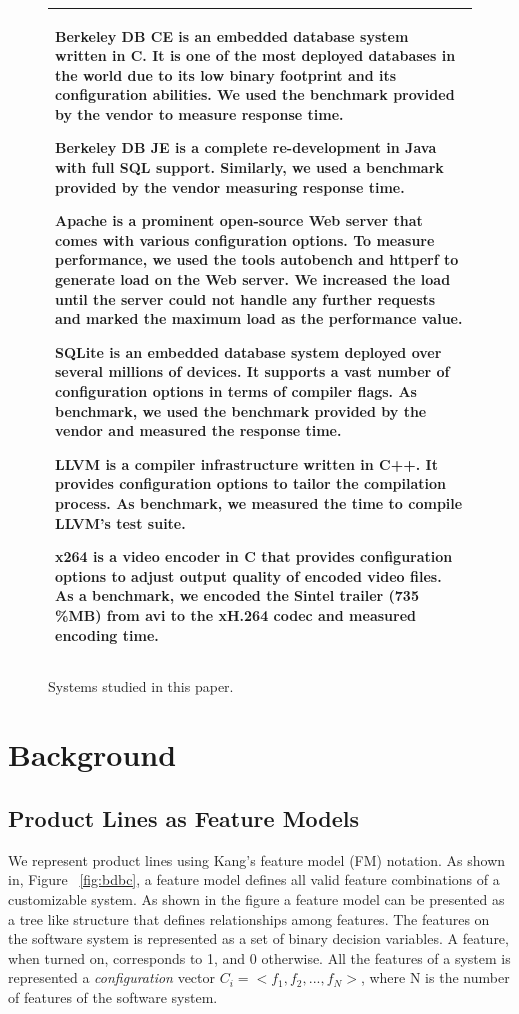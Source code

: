 \documentclass{sig-alternative}
\begin{document}
\begin{figure}\small
\begin{tabular}{|p{.95\linewidth}|}\hline
\textbf{Berkeley DB CE} is an embedded database system written in C. It is one of the most deployed databases in the world due to its low binary footprint and its configuration abilities. We used the benchmark provided by the vendor to measure response time.

\textbf{Berkeley DB JE} is a complete re-development in Java with full SQL support. Similarly, we used a benchmark provided by the vendor measuring response time.

\textbf{Apache} is a prominent open-source Web server that comes with various configuration options. To measure performance, we used the tools autobench and httperf to generate load on the Web server. We increased the load until the server could not handle any further requests and marked the maximum load as the performance value.

\textbf{SQLite} is an embedded database system deployed over several millions of devices. It supports a vast number of configuration options in terms of compiler flags. As benchmark, we used the benchmark provided by the vendor and measured the response time.

\textbf{LLVM} is a compiler infrastructure written in C++. It provides configuration options to tailor the compilation process. As benchmark, we measured the time to compile LLVM's test suite.

\textbf{x264} is a video encoder in C that provides configuration options to adjust output quality of encoded video files. As a benchmark, we encoded the Sintel trailer (735\,\%MB) from avi to the xH.264 codec and measured encoding time.\\\hline
\end{tabular}
\caption{Systems studied in this paper.}\label{fig:systems}
\end{figure}



\section{Background}  

\subsection{Product Lines as Feature Models}
We represent product lines using Kang's feature model (FM) notation. 
As shown in, Figure ~\ref{fig:bdbc}, a feature model defines all valid feature combinations of a customizable system. As shown in the figure a feature model can be presented as a tree like structure that defines relationships among features.   The features on the software system is represented as a set of binary decision variables. A feature, when turned on, corresponds to 1, and 0 otherwise. All the features of a system is represented a {\em configuration} vector  $C_i= <f_1, f_2, ...,f_N>$, where N is the number of features of the software system.  
    
\end{document}
